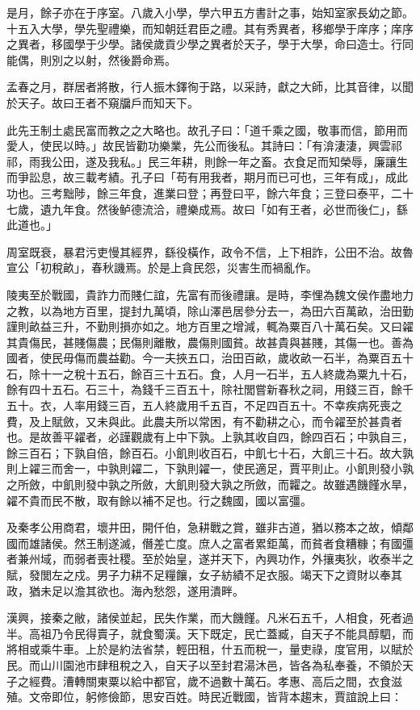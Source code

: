 \begin{pinyinscope}
是月，餘子亦在于序室。八歲入小學，學六甲五方書計之事，始知室家長幼之節。十五入大學，學先聖禮樂，而知朝廷君臣之禮。其有秀異者，移鄉學于庠序；庠序之異者，移國學于少學。諸侯歲貢少學之異者於天子，學于大學，命曰造士。行同能偶，則別之以射，然後爵命焉。

孟春之月，群居者將散，行人振木鐸徇于路，以采詩，獻之大師，比其音律，以聞於天子。故曰王者不窺牖戶而知天下。

此先王制土處民富而教之之大略也。故孔子曰：「道千乘之國，敬事而信，節用而愛人，使民以時。」故民皆勸功樂業，先公而後私。其詩曰：「有渰淒淒，興雲祁祁，雨我公田，遂及我私。」民三年耕，則餘一年之畜。衣食足而知榮辱，廉讓生而爭訟息，故三載考績。孔子曰「苟有用我者，期月而已可也，三年有成」，成此功也。三考黜陟，餘三年食，進業曰登；再登曰平，餘六年食；三登曰泰平，二十七歲，遺九年食。然後鲈德流洽，禮樂成焉。故曰「如有王者，必世而後仁」，繇此道也。」

周室既衰，暴君污吏慢其經界，繇役橫作，政令不信，上下相詐，公田不治。故魯宣公「初稅畝」，春秋譏焉。於是上貪民怨，災害生而禍亂作。

陵夷至於戰國，貴詐力而賤仁誼，先富有而後禮讓。是時，李悝為魏文侯作盡地力之教，以為地方百里，提封九萬頃，除山澤邑居參分去一，為田六百萬畝，治田勤謹則畝益三升，不勤則損亦如之。地方百里之增減，輒為粟百八十萬石矣。又曰糴其貴傷民，甚賤傷農；民傷則離散，農傷則國貧。故甚貴與甚賤，其傷一也。善為國者，使民毋傷而農益勸。今一夫挾五口，治田百畝，歲收畝一石半，為粟百五十石，除十一之稅十五石，餘百三十五石。食，人月一石半，五人終歲為粟九十石，餘有四十五石。石三十，為錢千三百五十，除社閭嘗新春秋之祠，用錢三百，餘千五十。衣，人率用錢三百，五人終歲用千五百，不足四百五十。不幸疾病死喪之費，及上賦斂，又未與此。此農夫所以常困，有不勸耕之心，而令糴至於甚貴者也。是故善平糴者，必謹觀歲有上中下孰。上孰其收自四，餘四百石；中孰自三，餘三百石；下孰自倍，餘百石。小飢則收百石，中飢七十石，大飢三十石。故大孰則上糴三而舍一，中孰則糴二，下孰則糴一，使民適足，賈平則止。小飢則發小孰之所斂，中飢則發中孰之所斂，大飢則發大孰之所斂，而糶之。故雖遇饑饉水旱，糴不貴而民不散，取有餘以補不足也。行之魏國，國以富彊。

及秦孝公用商君，壞井田，開仟伯，急耕戰之賞，雖非古道，猶以務本之故，傾鄰國而雄諸侯。然王制遂滅，僭差亡度。庶人之富者累鉅萬，而貧者食糟糠；有國彊者兼州域，而弱者喪社稷。至於始皇，遂并天下，內興功作，外攘夷狄，收泰半之賦，發閭左之戍。男子力耕不足糧饟，女子紡績不足衣服。竭天下之資財以奉其政，猶未足以澹其欲也。海內愁怨，遂用潰畔。

漢興，接秦之敝，諸侯並起，民失作業，而大饑饉。凡米石五千，人相食，死者過半。高祖乃令民得賣子，就食蜀漢。天下既定，民亡蓋臧，自天子不能具醇駟，而將相或乘牛車。上於是約法省禁，輕田租，什五而稅一，量吏祿，度官用，以賦於民。而山川園池市肆租稅之入，自天子以至封君湯沐邑，皆各為私奉養，不領於天子之經費。漕轉關東粟以給中都官，歲不過數十萬石。孝惠、高后之間，衣食滋殖。文帝即位，躬修儉節，思安百姓。時民近戰國，皆背本趨末，賈誼說上曰：


\end{pinyinscope}
